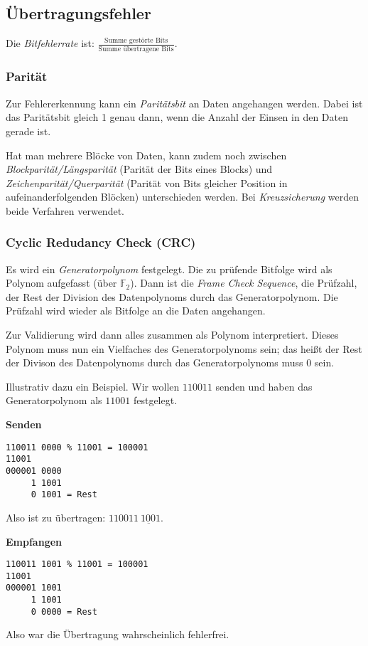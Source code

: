 \documentclass[a4paper,parskip=half*,DIV=15,fontsize=11pt]{scrartcl}
\begin{document}
\subsection{Übertragungsfehler}

Die \emph{Bitfehlerrate} ist: $\frac{\textrm{Summe gestörte Bits}}{\textrm{Summe übertragene Bits}}$.

\subsubsection{Parität}

Zur Fehlererkennung kann ein \emph{Paritätsbit} an Daten angehangen werden. Dabei ist das Paritätsbit gleich 1 genau dann, wenn die Anzahl der Einsen in den Daten gerade ist.

Hat man mehrere Blöcke von Daten, kann zudem noch zwischen \emph{Blockparität/Längsparität} (Parität der Bits eines Blocks) und \emph{Zeichenparität/Querparität} (Parität von Bits gleicher Position in aufeinanderfolgenden Blöcken) unterschieden werden. Bei \emph{Kreuzsicherung} werden beide Verfahren verwendet.

\subsubsection{Cyclic Redudancy Check (CRC)}

Es wird ein \emph{Generatorpolynom} festgelegt. Die zu prüfende Bitfolge wird als Polynom aufgefasst (über $\mathbb{F}_2$). Dann ist die \emph{Frame Check Sequence}, die Prüfzahl, der Rest der Division des Datenpolynoms durch das Generatorpolynom. Die Prüfzahl wird wieder als Bitfolge an die Daten angehangen.

Zur Validierung wird dann alles zusammen als Polynom interpretiert. Dieses Polynom muss nun ein Vielfaches des Generatorpolynoms sein; das heißt der Rest der Divison des Datenpolynoms durch das Generatorpolynoms muss 0 sein.

Illustrativ dazu ein Beispiel. Wir wollen $110011$ senden und haben das Generatorpolynom als $11001$ festgelegt.

\begin{minipage}[t]{0.5\textwidth}
\textbf{Senden}
\begin{lstlisting}
110011 0000 % 11001 = 100001
11001
000001 0000
     1 1001
     0 1001 = Rest
\end{lstlisting}
Also ist zu übertragen: $110011~\underbar{1001}$.
\end{minipage}
\begin{minipage}[t]{0.5\textwidth}
\textbf{Empfangen}
\begin{lstlisting}
110011 1001 % 11001 = 100001
11001
000001 1001
     1 1001
     0 0000 = Rest
\end{lstlisting}
Also war die Übertragung wahrscheinlich fehlerfrei.
\end{minipage}
\end{document}
